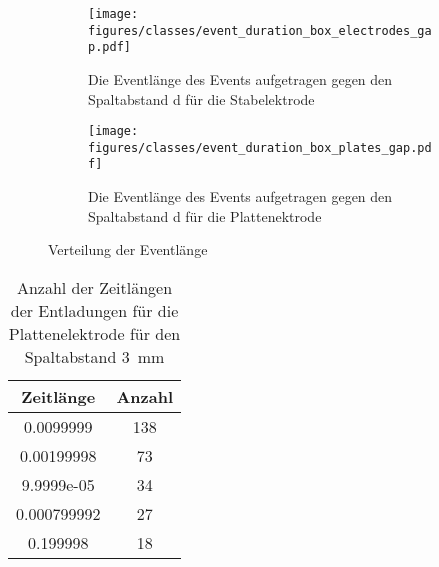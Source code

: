 \begin{figure}[H]
  \centering
  \begin{subfigure}[t]{0.48\textwidth}
    \centering
    \texttt{[image: figures/classes/event\_duration\_box\_electrodes\_gap.pdf]}
    \caption{Die Eventlänge des Events aufgetragen gegen den Spaltabstand d für die Stabelektrode}
    \label{fig:box-gap-event-duration-stab}
  \end{subfigure}
  \begin{subfigure}[t]{0.48\textwidth}
    \centering
    \texttt{[image: figures/classes/event\_duration\_box\_plates\_gap.pdf]}
    \caption{Die Eventlänge des Events aufgetragen gegen den Spaltabstand d für die Plattenektrode}
    \label{fig:box-gap-event-duration-plate}
  \end{subfigure}
  \caption{Verteilung der Eventlänge}
  \label{fig:box-gap-event-duration}
\end{figure}


\begin{table}[h!]
\centering
\begin{tabular}{|c|c|}
\hline
\textbf{Zeitlänge} & \textbf{Anzahl} \\
\hline
0.0099999   & 138 \\
0.00199998  & 73  \\
9.9999e-05  & 34  \\
0.000799992 & 27  \\
0.199998    & 18  \\
\hline
\end{tabular}
\caption{Anzahl der Zeitlängen der Entladungen für die Plattenelektrode für den Spaltabstand \SI{3}{\milli\meter}}
\label{tab:timelen-plate-3}
\end{table}

